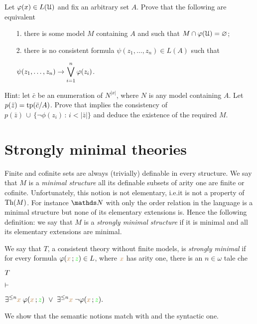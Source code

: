 \begin{exercise}
Let $\varphi(x)\in L(\EuScript U)$ and fix an arbitrary set $A$.
Prove that the following are equivalent
\begin{itemize}
\item[1.] there is some model $M$ containing $A$ and such that $M\cap\varphi(\EuScript U)=\varnothing$;
\item[2.] there is no consistent formula $\psi(z_1,\dots,z_n)\in L(A)$ such that

\hfil$\displaystyle\psi(z_1,\dots,z_n)\rightarrow\bigvee^n_{i=1}\varphi(z_i)$.
\end{itemize}
Hint: let $\bar c$ be an enumeration of $N^{|x|}$, where $N$ is any model containing $A$.
Let $p(\bar z)={\rm tp}(\bar c/A)$.
Prove that  implies the consistency of $p(\bar z)\,\cup\, \big\{\neg\phi(z_i)\, :\, i<|\bar z|\big\}$ and deduce the existence of the required $M$.\QED
\end{exercise}


\section{Strongly minimal theories\label{tfm}}%
 
\def\medrel#1{\parbox[t]{5ex}{$\displaystyle\hfil #1$}}
\def\ceq#1#2#3{\parbox{15ex}{$\displaystyle #1$}\medrel{#2}$\displaystyle  #3$}

Finite and cofinite sets are always (trivially) definable in every structure.
We say that $M$ is a \emph{minimal structure\/} all its definable subsets of arity one are finite or cofinite.
Unfortunately, this notion is not elementary, i.e.\@ it is not a property of $\textrm{Th}(M)$.
For instance $\NN$ with only the order relation in the language is a minimal structure but 
none of its elementary extensions is.
Hence the following definition: 
we say that $M$ is a \emph{strongly minimal structure\/} if it is minimal and all its elementary extensions are minimal.

We say that $T$, a consistent theory without finite models, is \emph{strongly minimal\/} if 
for every formula $\varphi({\color{brown} x}\,;{\color{green} z})\in L$, where ${\color{brown} x}$ has arity one, there is an  $n\in\omega$ tale che

\ceq{\hfill T}
{\proves}
{\E^{\le n}{\mr x}\;\phi({\mr x}\,;{\gr z})\ \vee\ \E^{\le n}{\mr x}\;\neg\phi({\mr x}\,;{\gr z}).}

We show that the semantic notions match with and the syntactic one.



